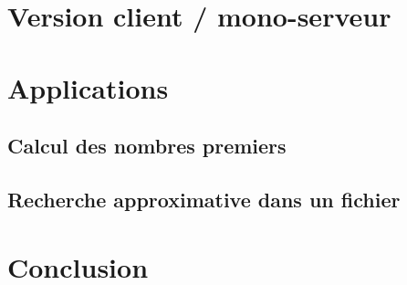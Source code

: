 \documentclass[headings=standardclasses,parskip=half]{scrartcl}
\begin{document}
\section{Version client / mono-serveur}

\section{Applications}

\subsection{Calcul des nombres premiers}

\subsection{Recherche approximative dans un fichier}

\section{Conclusion}
\end{document}
